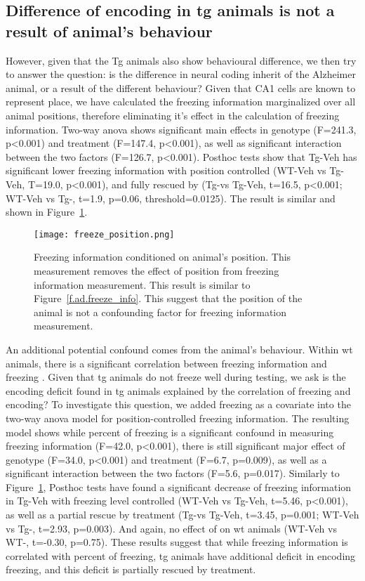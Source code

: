 \subsection{Difference of encoding in \gls{tg} animals is not a result of animal's behaviour}

However, given that the Tg animals also show behavioural difference, we then try to answer the question: is the difference in neural coding inherit of the Alzheimer animal, or a result of the different behaviour? Given that CA1 cells are known to represent place, we have calculated the freezing information marginalized over all animal positions, therefore eliminating it's effect in the calculation of freezing information. Two-way \gls{anova} shows significant main effects in genotype (F=241.3, p<0.001) and treatment (F=147.4, p<0.001), as well as significant interaction between the two factors (F=126.7, p<0.001). Posthoc tests show that Tg-Veh has significant lower freezing information with position controlled (WT-Veh vs Tg-Veh, T=19.0, p<0.001), and fully rescued by \tglu (Tg-\glu vs Tg-Veh, t=16.5, p<0.001; WT-Veh vs Tg-\glu, t=1.9, p=0.06, threshold=0.0125). The result is similar and shown in Figure~\ref{f.ad.freeze_ctrl}.  
\begin{figure}[h]
    \texttt{[image: freeze\_position.png]}
    \caption{Freezing information conditioned on animal's position. This measurement removes the effect of position from freezing information measurement. This result is similar to Figure~\ref{f.ad.freeze_info}. This suggest that the position of the animal is not a confounding factor for freezing information measurement. \label{f.ad.freeze_ctrl}}
\end{figure}


An additional potential confound comes from the animal's behaviour. Within \gls{wt} animals, there is a significant correlation between freezing information and freezing . Given that \gls{tg} animals do not freeze well during testing, we ask is the encoding deficit found in \gls{tg} animals explained by the correlation of freezing and encoding? To investigate this question, we added freezing as a covariate into the two-way \gls{anova} model for position-controlled freezing information. The resulting model shows while percent of freezing is a significant confound in measuring freezing information (F=42.0, p<0.001), there is still significant major effect of genotype (F=34.0, p<0.001) and treatment (F=6.7, p=0.009), as well as a significant interaction between the two factors (F=5.6, p=0.017). Similarly to Figure~\ref{f.ad.freeze_ctrl}, Posthoc tests have found a significant decrease of freezing information in Tg-Veh with freezing level controlled (WT-Veh vs Tg-Veh, t=5.46, p<0.001), as well as a partial rescue by \tglu treatment (Tg-\glu vs Tg-Veh, t=3.45, p=0.001; WT-Veh vs Tg-\glu, t=2.93, p=0.003). And again, no effect of \tglu on \gls{wt} animals (WT-Veh vs WT-\glu, t=-0.30, p=0.75). These results suggest that while freezing information is correlated with percent of freezing, \gls{tg} animals have additional deficit in encoding freezing, and this deficit is partially rescued by \tglu treatment. 


